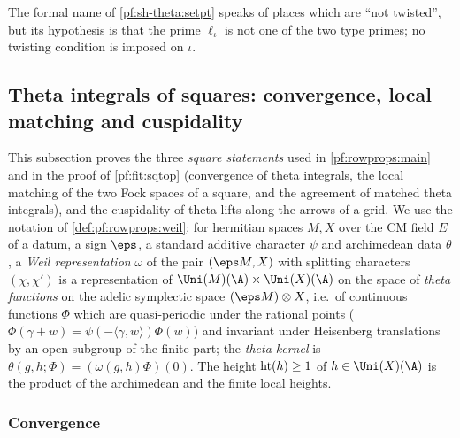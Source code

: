 \begin{remark}\label{pf:sh-theta:setptrem}
The formal name of \cref{pf:sh-theta:setpt} speaks of places which are ``not twisted'', but its hypothesis is that the prime
$\ell_\iota$ is not one of the two type primes; no twisting condition is imposed on $\iota$.
\end{remark}

\subsection{Theta integrals of squares: convergence, local matching and cuspidality}\label{sec:pf:sh-theta:squares}

This subsection proves the three \emph{square statements} used in \cref{pf:rowprops:main} and in the proof of
\cref{pf:fit:sqtop} (convergence of theta integrals, the local matching of the two Fock spaces of a square, and the
agreement of matched theta integrals), and the cuspidality of theta lifts along the arrows of a grid. We use the notation
of \cref{def:pf:rowprops:weil}: for hermitian spaces $M,X$ over the CM field $E$ of a datum, a sign $\eps$, a standard
additive character $\psi$ and archimedean data $\theta$, a \emph{Weil representation} $\omega$ of the pair $(\eps M,X)$
with splitting characters $(\chi,\chi')$ is a representation of $\Uni(M)(\A)\times\Uni(X)(\A)$ on the space of
\emph{theta functions} on the adelic symplectic space $(\eps M)\otimes X$, i.e.\ of continuous functions $\Phi$ which are
quasi-periodic under the rational points ($\Phi(\gamma+w)=\psi(-\langle\gamma,w\rangle)\Phi(w)$) and invariant under
Heisenberg translations by an open subgroup of the finite part; the \emph{theta kernel} is
$\theta(g,h;\Phi)=(\omega(g,h)\Phi)(0)$. The height $\operatorname{ht}(h)\ge1$ of $h\in\Uni(X)(\A)$ is the product of the
archimedean and the finite local heights.

\subsubsection{Convergence}


